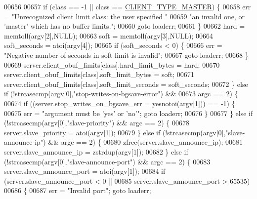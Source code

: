 \begin{DoxyCode}
{{00656 
00657             \textcolor{keywordflow}{if} (\textcolor{keyword}{class} == -1 || \textcolor{keyword}{class} == \hyperlink{server_8h_ae96c04932d9a47108994d8f337fd8563}{CLIENT\_TYPE\_MASTER}) \{
00658                 err = \textcolor{stringliteral}{"Unrecognized client limit class: the user specified "}
00659                 \textcolor{stringliteral}{"an invalid one, or 'master' which has no buffer limits."};
00660                 \textcolor{keywordflow}{goto} loaderr;
00661             \}
00662             hard = memtoll(argv[2],NULL);
00663             soft = memtoll(argv[3],NULL);
00664             soft\_seconds = atoi(argv[4]);
00665             \textcolor{keywordflow}{if} (soft\_seconds < 0) \{
00666                 err = \textcolor{stringliteral}{"Negative number of seconds in soft limit is invalid"};
00667                 \textcolor{keywordflow}{goto} loaderr;
00668             \}
00669             server.client\_obuf\_limits[\textcolor{keyword}{class}].hard\_limit\_bytes = hard;
00670             server.client\_obuf\_limits[\textcolor{keyword}{class}].soft\_limit\_bytes = soft;
00671             server.client\_obuf\_limits[\textcolor{keyword}{class}].soft\_limit\_seconds = soft\_seconds;
00672         \} \textcolor{keywordflow}{else} \textcolor{keywordflow}{if} (!strcasecmp(argv[0],\textcolor{stringliteral}{"stop-writes-on-bgsave-error"}) &&
00673                    argc == 2) \{
00674             \textcolor{keywordflow}{if} ((server.stop\_writes\_on\_bgsave\_err = yesnotoi(argv[1])) == -1) \{
00675                 err = \textcolor{stringliteral}{"argument must be 'yes' or 'no'"}; \textcolor{keywordflow}{goto} loaderr;
00676             \}
00677         \} \textcolor{keywordflow}{else} \textcolor{keywordflow}{if} (!strcasecmp(argv[0],\textcolor{stringliteral}{"slave-priority"}) && argc == 2) \{
00678             server.slave\_priority = atoi(argv[1]);
00679         \} \textcolor{keywordflow}{else} \textcolor{keywordflow}{if} (!strcasecmp(argv[0],\textcolor{stringliteral}{"slave-announce-ip"}) && argc == 2) \{
00680             zfree(server.slave\_announce\_ip);
00681             server.slave\_announce\_ip = zstrdup(argv[1]);
00682         \} \textcolor{keywordflow}{else} \textcolor{keywordflow}{if} (!strcasecmp(argv[0],\textcolor{stringliteral}{"slave-announce-port"}) && argc == 2) \{
00683             server.slave\_announce\_port = atoi(argv[1]);
00684             \textcolor{keywordflow}{if} (server.slave\_announce\_port < 0 ||
00685                 server.slave\_announce\_port > 65535)
00686             \{
00687                 err = \textcolor{stringliteral}{"Invalid port"}; \textcolor{keywordflow}{goto} loaderr;
}}
\end{DoxyCode}
